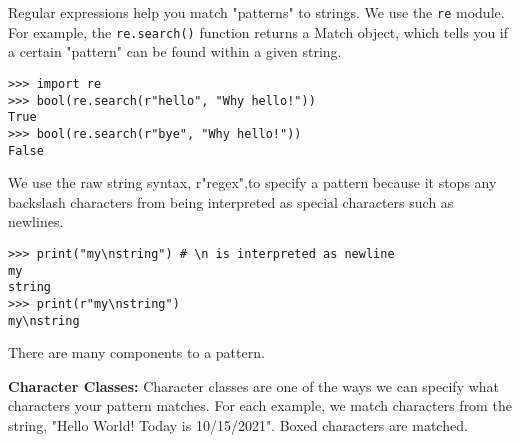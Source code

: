 Regular expressions help you match "patterns" to strings. We use the \lstinline{re} module.
For example, the \lstinline{re.search()} function returns a Match object, which tells you if a certain "pattern" can be found within a given string.

\begin{lstlisting}
>>> import re
>>> bool(re.search(r"hello", "Why hello!"))
True
>>> bool(re.search(r"bye", "Why hello!"))
False
\end{lstlisting}

We use the raw string syntax, r"regex",to specify a pattern because
it stops any backslash characters from being interpreted as special characters such as newlines.

\begin{lstlisting}
>>> print("my\nstring") # \n is interpreted as newline
my
string
>>> print(r"my\nstring")
my\nstring
\end{lstlisting}

There are many components to a pattern.

\textbf{Character Classes:}
Character classes are one of the ways we can specify what characters your pattern matches.
For each example, we match characters from the string, "Hello World! Today is 10/15/2021".
Boxed characters are matched.

